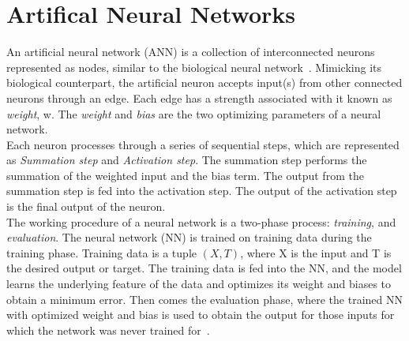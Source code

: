 \documentclass[12pt,a4paper,bold]{thesis}
\theoremstyle{thm}
\theoremstyle{definition}
\begin{document}
\section{Artifical Neural Networks}
 \indent \indent An artificial neural network (ANN) is a collection of interconnected neurons represented as nodes, similar to the biological neural network~\cite{hinton2015deep}. Mimicking its biological counterpart, the artificial neuron accepts input(s) from other connected neurons through an edge. Each edge has a strength associated with it known as \textit{weight}, w. The \textit{weight} and \textit{bias} are the two optimizing parameters of a neural network.\\
\indent \indent Each neuron processes through a series of sequential steps, which are represented as \textit{Summation step} and \textit{Activation step}.
The summation step performs the summation of the weighted input and the bias term.
The output from the summation step is fed into the activation step. The output of the activation step is the final output of the neuron.\\
\indent \indent The working procedure of a neural network is a two-phase process: \textit{training}, and \textit{evaluation}. The neural network (NN) is trained on training data during the training phase. Training data is a tuple $(X, T)$, where X is the input and T is the desired output or target. The training data is fed into the NN, and the model learns the underlying feature of the data and optimizes its weight and biases to obtain a minimum error. Then comes the evaluation phase, where the trained NN with optimized weight and bias is used to obtain the output for those inputs for which the network was never trained for~\cite{hinton2015deep}.

\pagebreak
\end{document}
